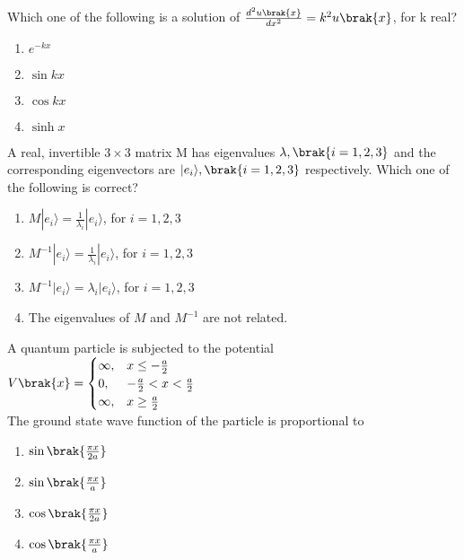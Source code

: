 
\iffalse
    \author{EE24BTECH11043}
    \section{ph}
    \chapter{2020}
\fi
	\item Which one of the following is a solution of $\frac{d^2 u\brak{x}}{dx^2}=k^2u\brak{x}$, for k real?
		\begin{enumerate}
			\item $e^{-kx}$
			\item $\sin {kx}$
			\item $\cos {kx}$
			\item $\sinh {x}$
		\end{enumerate}
	\item A real, invertible $3\times 3$ matrix M has eigenvalues $\lambda,\brak{i=1,2,3}$ and the corresponding eigenvectors are $|e_i\rangle , \brak{i=1,2,3}$ respectively. Which one of the following is correct?
		\begin{enumerate}
			\item $M |e_i \rangle = \frac{1}{\lambda_i}|e_i\rangle$, for $i=1,2,3$
			\item $M^{-1}|e_i \rangle = \frac{1}{\lambda_i}|e_i\rangle$, for $i=1,2,3$
			\item $M^{-1}|e_i \rangle = \lambda_i|e_i\rangle$, for $i=1,2,3$
			\item The eigenvalues of $M$ and $M^{-1}$ are not related.
		\end{enumerate}
	\item A quantum particle is subjected to the potential \\
		$ V\brak{x} =
		\begin{cases}
			\infty, & x\le -\frac{a}{2} \\
			0, & -\frac{a}{2} < x < \frac{a}{2} \\
			\infty, & x\ge \frac{a}{2}
		\end{cases}$ \\
		The ground state wave function of the particle is proportional to
		\begin{enumerate}
			\item $\sin{\brak{\frac{\pi x}{2a}}}$
			\item $\sin{\brak{\frac{\pi x}{a}}}$
			\item $\cos{\brak{\frac{\pi x}{2a}}}$
			\item $\cos{\brak{\frac{\pi x}{a}}}$
		\end{enumerate}
